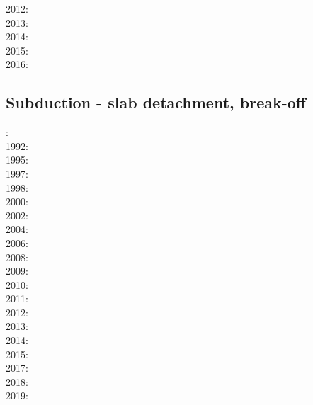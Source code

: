 2012: \cite{anwb12}\cite{jahu12}\cite{jabi12}\cite{jabk12}\cite{lixg12}\cite{grpy12}\cite{grpy12b}
\cite{ronb12}\cite{tebu12}\cite{thka12}\cite{bova12}\cite{civs12}\cite{camo12}\cite{cafa12}
\cite{gebk12}\cite{liri12}\cite{beva12}\cite{uegb12}\\
2013: \cite{nabg13}\cite{hage13}\cite{ancv13}\cite{namu13}\cite{yosh13}\cite{zhgt13}\cite{lixg13}
\cite{jabr13}\cite{izht13}\cite{luws13}\cite{dusc13}\cite{tibb13}\cite{bubj13}\cite{scmo13}\cite{fuob13}
\cite{magc13}\cite{musi13}\cite{mibg13}\cite{grpy13}\cite{vagd13a}\cite{vagd13b}\cite{cavg13}\cite{vocg13}\\
2014: \cite{robn14}\cite{hond14}\cite{ronc14}\cite{mobm14}\cite{famc14}\cite{fogm14}\cite{frba14}
\cite{gagd14}\cite{voge14}\cite{voge14b}\cite{lidr14}\cite{bocj04}\cite{bagb14}\cite{stjm14}\cite{basc14}\cite{vamd14}\\
2015: \cite{bemm15}\cite{bomv15}\cite{bogf15}\cite{ceag15}\cite{kifr15}\cite{vami15}\\
2016: \cite{tomy16}\cite{gukt16}\cite{robn16}

\subsection*{Subduction - slab detachment, break-off}

: \cite{futo85}\\
1992: \cite{wosp92}\\
1995: \cite{yowo95}\cite{voda95}\\
1997: \cite{wowo97}\\
1998: \cite{desw98}\cite{caws98}\\
2000: \cite{wosp00}\\
2002: \cite{bugw02}\\
2004: \cite{geym04}\\
2006: \cite{fabm06}\\
2008: \cite{zlfd08}\\
2009: \cite{anbi09}\cite{bubi09}\\
2010: \cite{bubi10}\cite{bagc10}\\
2011: \cite{dugm11}\cite{vaal11}\\
2012: \cite{dugk12}\cite{dusg12}\\
2013: \cite{care13}\cite{mafv13}\cite{ghbu13}\cite{duge13}\\
2014: \cite{dugs14}\cite{besr14}\cite{vosd14}\\
2015: \cite{vosc15}\\
2017: \cite{frbm17}\\
2018: \cite{garm18}\\
2019: \cite{beml19}

